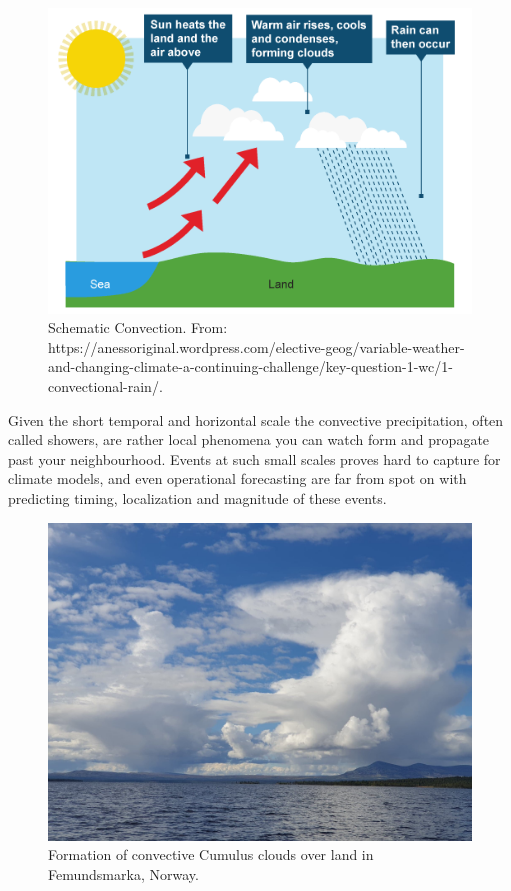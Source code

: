 \begin{figure}[hbt!]
    \centering
    \includegraphics[scale=0.4]{figures/convection-rain.png}
    \caption{Schematic Convection. From: https://anessoriginal.wordpress.com/elective-geog/variable-weather-and-changing-climate-a-continuing-challenge/key-question-1-wc/1-convectional-rain/.
    \cite{convection}}
    \label{fig:convection}
\end{figure}


Given the short temporal and horizontal scale the convective precipitation, often called showers, are rather local phenomena you can watch form and propagate past your neighbourhood. Events at such small scales proves hard to capture for climate models, and even operational forecasting are far from spot on with predicting timing, localization and magnitude of these events. 

\begin{figure}[hbt!]
    \centering
    \includegraphics[scale=0.2]{figures/cumulus_bilde.jpg}
    \caption{Formation of convective Cumulus clouds over land in Femundsmarka, Norway.
    \cite{cumulus}}
    \label{fig:cumulus}
\end{figure}

